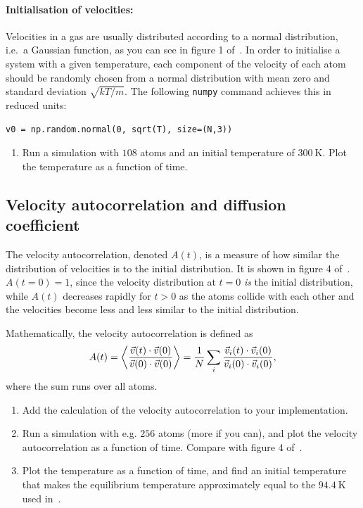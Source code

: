 \documentclass[11pt,british,a4paper]{report}
\begin{document}
\paragraph{Initialisation of velocities:} Velocities in a gas are usually distributed according to a normal distribution, i.e.~a Gaussian function, as you can see in figure 1 of~\cite{Rahman_1964}. In order to initialise a system with a given temperature, each component of the velocity of each atom should be randomly chosen from a normal distribution with mean zero and standard deviation \(\sqrt{kT/m}\). The following \texttt{numpy} command achieves this in reduced units:
\begin{lstlisting}
v0 = np.random.normal(0, sqrt(T), size=(N,3))
\end{lstlisting}

\begin{enumerate}[label=\roman*.,resume]
    \item Run a simulation with \(108\) atoms and an initial temperature of \(\SI{300}{\kelvin}\). Plot the temperature as a function of time.
\end{enumerate}

\subsection{Velocity autocorrelation and diffusion coefficient}
The velocity autocorrelation, denoted \(A(t)\), is a measure of how similar the distribution of velocities is to the initial distribution. It is shown in figure 4 of~\cite{Rahman_1964}. \(A(t=0)=1\), since the velocity distribution at \(t=0\) \emph{is} the initial distribution, while \(A(t)\) decreases rapidly for \(t>0\) as the atoms collide with each other and the velocities become less and less similar to the initial distribution.

Mathematically, the velocity autocorrelation is defined as
\begin{equation}
    A(t) = \ev{\frac{\vec{v}(t)\cdot\vec{v}(0)}{\vec{v}(0)\cdot\vec{v}(0)}}
         = \frac{1}{N} \sum_i \frac{\vec{v}_i(t)\cdot\vec{v}_i(0)}{\vec{v}_i(0)\cdot\vec{v}_i(0)},\label{eq:vacf}
\end{equation}
where the sum runs over all atoms.

\begin{enumerate}[label=\roman*.]
    \item Add the calculation of the velocity autocorrelation to your implementation.
    \item Run a simulation with e.g. \(256\) atoms (more if you can), and plot the velocity autocorrelation as a function of time. Compare with figure 4 of~\cite{Rahman_1964}.
    \item Plot the temperature as a function of time, and find an initial temperature that makes the equilibrium temperature approximately equal to the \(\SI{94.4}{\kelvin}\) used in~\cite{Rahman_1964}.
\end{enumerate}
\end{document}
